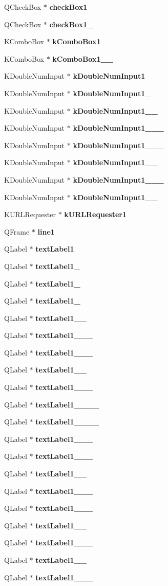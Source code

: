 \begin{CompactItemize}
\item 
QCheck\-Box $\ast$ {\bf check\-Box1}
\item 
QCheck\-Box $\ast$ {\bf check\-Box1\_}
\item 
KCombo\-Box $\ast$ {\bf k\-Combo\-Box1}
\item 
KCombo\-Box $\ast$ {\bf k\-Combo\-Box1\_\_}
\item 
KDouble\-Num\-Input $\ast$ {\bf k\-Double\-Num\-Input1}
\item 
KDouble\-Num\-Input $\ast$ {\bf k\-Double\-Num\-Input1\_}
\item 
KDouble\-Num\-Input $\ast$ {\bf k\-Double\-Num\-Input1\_\_}
\item 
KDouble\-Num\-Input $\ast$ {\bf k\-Double\-Num\-Input1\_\_\_}
\item 
KDouble\-Num\-Input $\ast$ {\bf k\-Double\-Num\-Input1\_\_\_}
\item 
KDouble\-Num\-Input $\ast$ {\bf k\-Double\-Num\-Input1\_\_}
\item 
KDouble\-Num\-Input $\ast$ {\bf k\-Double\-Num\-Input1\_\_\_}
\item 
KDouble\-Num\-Input $\ast$ {\bf k\-Double\-Num\-Input1\_\_}
\item 
KURLRequester $\ast$ {\bf k\-URLRequester1}
\item 
QFrame $\ast$ {\bf line1}
\item 
QLabel $\ast$ {\bf text\-Label1}
\item 
QLabel $\ast$ {\bf text\-Label1\_}
\item 
QLabel $\ast$ {\bf text\-Label1\_}
\item 
QLabel $\ast$ {\bf text\-Label1\_}
\item 
QLabel $\ast$ {\bf text\-Label1\_\_}
\item 
QLabel $\ast$ {\bf text\-Label1\_\_\_}
\item 
QLabel $\ast$ {\bf text\-Label1\_\_\_}
\item 
QLabel $\ast$ {\bf text\-Label1\_\_}
\item 
QLabel $\ast$ {\bf text\-Label1\_\_\_}
\item 
QLabel $\ast$ {\bf text\-Label1\_\_\_\_}
\item 
QLabel $\ast$ {\bf text\-Label1\_\_\_\_}
\item 
QLabel $\ast$ {\bf text\-Label1\_\_\_}
\item 
QLabel $\ast$ {\bf text\-Label1\_\_\_}
\item 
QLabel $\ast$ {\bf text\-Label1\_\_}
\item 
QLabel $\ast$ {\bf text\-Label1\_\_\_}
\item 
QLabel $\ast$ {\bf text\-Label1\_\_\_}
\item 
QLabel $\ast$ {\bf text\-Label1\_\_}
\item 
QLabel $\ast$ {\bf text\-Label1\_\_\_}
\item 
QLabel $\ast$ {\bf text\-Label1\_\_}
\item 
QLabel $\ast$ {\bf text\-Label1\_\_\_}
\end{CompactItemize}

